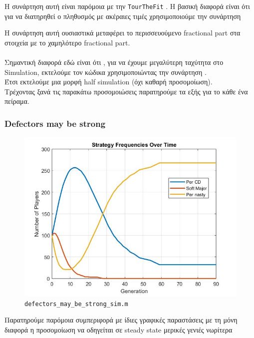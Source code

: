 Η συνάρτηση αυτή είναι παρόμοια με την \texttt{TourTheFit} . Η βασική διαφορά είναι ότι για να διατηρηθεί ο πληθυσμός με ακέραιες τιμές χρησιμοποιούμε την συνάρτηση 


Η συνάρτηση αυτή ουσιαστικά μεταφέρει το περισσευούμενο fractional part στα στοιχεία με το χαμηλότερο fractional part. 
\\
\\
Σημαντική διαφορά εδώ είναι ότι , για να έχουμε μεγαλύτερη ταχύτητα στο Simulation, εκτελούμε τον κώδικα χρησιμοποιώντας την συνάρτηση .
\\

Έτσι εκτελούμε μια μορφή half simulation (όχι καθαρή προσομοίωση). 
\\

Τρέχοντας ξανά τις παρακάτω προσομοιώσεις παρατηρούμε τα εξής για το κάθε ένα πείραμα.
\subsubsection{Defectors may be strong}

\begin{figure}[ht!]
\centering
\includegraphics[width=0.5\linewidth]{fit_plots_simulations/defectors_may_be_strong_sim}
\caption{\texttt{defectors\_may\_be\_strong\_sim.m}}
\label{fig:defectorsmaybestrongsim}
\end{figure}

Παρατηρούμε παρόμοια συμπεριφορά με ίδιες γραφικές παραστάσεις με τη μόνη διαφορά η προσομοίωση να οδηγείται σε steady state μερικές γενιές νωρίτερα
\clearpage


